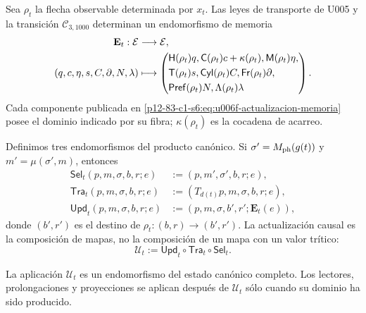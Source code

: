 {Sea \(\rho_t\) la flecha observable determinada por \(x_t\). Las leyes de
transporte de U005 y la transición \(\mathcal C_{3,1000}\) determinan un
endomorfismo de memoria
\begin{align}
 \mathbf E_t:\mathcal E&\longrightarrow\mathcal E,\notag\\
 (q,c,\eta,s,C,\partial,N,\lambda)&\longmapsto
 \left(
 \begin{aligned}
 &\mathsf H(\rho_t)q,
  \mathsf C(\rho_t)c+\kappa(\rho_t),
  \mathsf M(\rho_t)\eta,\\
 &\mathsf T(\rho_t)s,
  \mathsf{Cyl}(\rho_t)C,
  \mathsf{Fr}(\rho_t)\partial,\\
 &\mathsf{Pref}(\rho_t)N,
  \Lambda(\rho_t)\lambda
 \end{aligned}
 \right).
 \label{p12-83-c1-s6:eq:u006f-actualizacion-memoria}
\end{align}
Cada componente publicada en \eqref{p12-83-c1-s6:eq:u006f-actualizacion-memoria} posee el
dominio indicado por su fibra; \(\kappa(\rho_t)\) es la cocadena de acarreo.

Definimos tres endomorfismos del producto canónico. Si
\(\sigma'=M_{\rm ph}(g(t))\) y \(m'=\mu(\sigma',m)\), entonces
\begin{align}
 \mathsf{Sel}_t(p,m,\sigma,b,r;e)
  &:=(p,m',\sigma',b,r;e),\label{p12-83-c1-s6:eq:u006f-selector-tipado}\\
 \mathsf{Tra}_t(p,m,\sigma,b,r;e)
  &:=(T_{d(t)}p,m,\sigma,b,r;e),\label{p12-83-c1-s6:eq:u006f-transporte-tipado}\\
 \mathsf{Upd}_t(p,m,\sigma,b,r;e)
  &:=(p,m,\sigma,b',r';\mathbf E_t(e)),
 \label{p12-83-c1-s6:eq:u006f-memoria-tipada}
\end{align}
donde \((b',r')\) es el destino de \(\rho_t:(b,r)\to(b',r')\). La actualización
causal es la composición de mapas, no la composición de un mapa con un valor
trítico:
\begin{equation}
 \boxed{\mathcal U_t:=
 \mathsf{Upd}_t\circ\mathsf{Tra}_t\circ\mathsf{Sel}_t.}
 \label{p12-83-c1-s6:eq:u006f-tuberia}
\end{equation}

\begin{theorem}
\label{p12-83-c1-s6:thm:u006f-cierre-tuberia}
La aplicación \(\mathcal U_t\) es un endomorfismo del estado canónico
completo. Los lectores, prolongaciones y proyecciones se aplican después de
\(\mathcal U_t\) sólo cuando su dominio ha sido producido.
\end{theorem}

}
